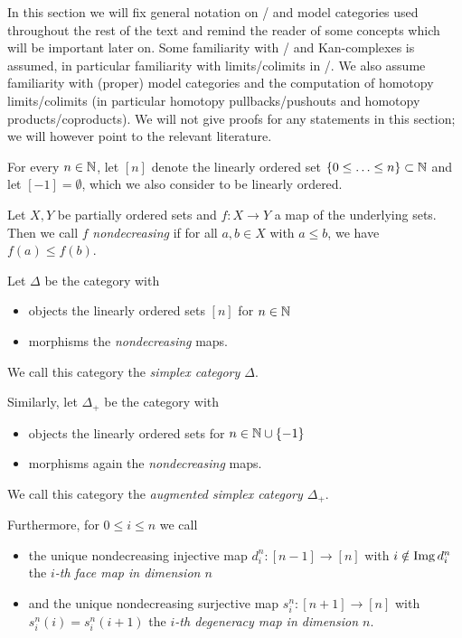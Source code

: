 In this section we will fix general notation on \inftycats/ and model categories used throughout the rest of the text and remind the reader of some concepts which will be important later on.
Some familiarity with \inftycats/ and Kan-complexes is assumed, in particular familiarity with limits/colimits in \inftycats/.
We also assume familiarity with (proper) model categories and the computation of homotopy limits/colimits (in particular homotopy pullbacks/pushouts and homotopy products/coproducts). 
We will not give proofs for any statements in this section; we will however point to the relevant literature.
\begin{definition}
    For every $n\in\mathbb{N}$, let $[n]$ denote the linearly ordered set $\left\lbrace0\leq\ldots\leq n\right\rbrace\subset\mathbb{N}$ and let $[-1]=\emptyset$, which we also consider to be linearly ordered.
\end{definition}
\begin{definition}
    Let $X,Y$ be partially ordered sets and $f\colon X\to Y$ a map of the underlying sets.
    Then we call $f$ \emph{nondecreasing} if for all $a,b\in X$ with $a\leq b$, we have $f(a)\leq f(b)$.
\end{definition}
\begin{definition}
    Let $\Delta$ be the category with
    \begin{itemize}
        \item objects the linearly ordered sets $[n]$ for $n\in\mathbb{N}$
        \item morphisms the \emph{nondecreasing} maps.
    \end{itemize}
    We call this category the \emph{simplex category $\Delta$}.

    Similarly, let $\Delta_+$ be the category with
    \begin{itemize}
        \item objects the linearly ordered sets for $n\in\mathbb{N}\cup\left\lbrace-1\right\rbrace$ 
        \item morphisms again the \emph{nondecreasing} maps.
    \end{itemize}
    We call this category the \emph{augmented simplex category $\Delta_+$}.

    Furthermore, for $0\leq i\leq n$ we call
    \begin{itemize}
        \item the unique nondecreasing injective map $d_i^n\colon[n-1]\to[n]$ with $i\notin\operatorname{Img} d_i^n$ the \emph{$i$-th face map in dimension $n$}
        \item and the unique nondecreasing surjective map $s_i^n\colon[n+1]\to[n]$ with $s_i^n(i)=s_i^n(i+1)$ the \emph{$i$-th degeneracy map in dimension $n$}.
    \end{itemize}
\end{definition}
